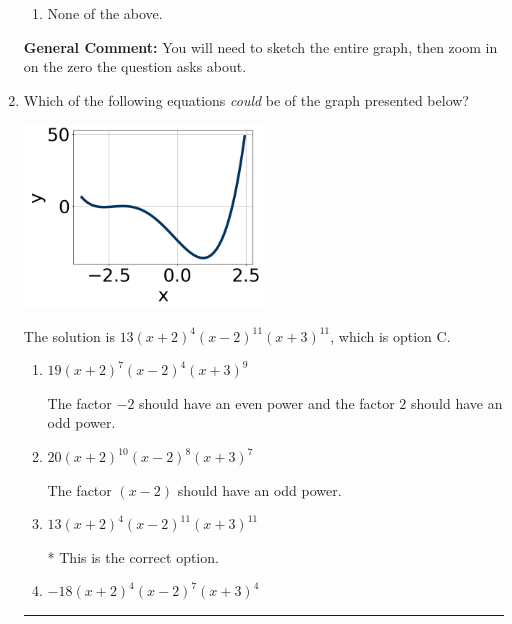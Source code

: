 \documentclass{extbook}[14pt]
\newcommand{\litem}[1]{\item #1

\rule{\textwidth}{0.4pt}}
\begin{document}
\begin{enumerate}
{\begin{enumerate}[label=\Alph*.]
\item None of the above.\end{enumerate}
\textbf{General Comment:} You will need to sketch the entire graph, then zoom in on the zero the question asks about.
}
\litem{
Which of the following equations \textit{could} be of the graph presented below?

\begin{center}
    \includegraphics[width=0.5\textwidth]{../Figures/polyGraphToFunctionB.png}
\end{center}


The solution is \( 13(x + 2)^{4} (x - 2)^{11} (x + 3)^{11} \), which is option C.\begin{enumerate}[label=\Alph*.]
\item \( 19(x + 2)^{7} (x - 2)^{4} (x + 3)^{9} \)

The factor $-2$ should have an even power and the factor $2$ should have an odd power.
\item \( 20(x + 2)^{10} (x - 2)^{8} (x + 3)^{7} \)

The factor $(x - 2)$ should have an odd power.
\item \( 13(x + 2)^{4} (x - 2)^{11} (x + 3)^{11} \)

* This is the correct option.
\item \( -18(x + 2)^{4} (x - 2)^{7} (x + 3)^{4} \)


\end{enumerate}}
\end{enumerate}
\end{document}
